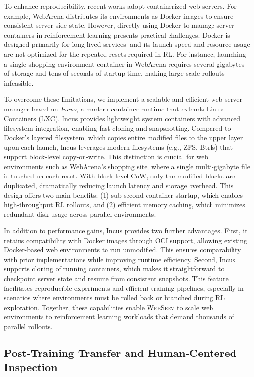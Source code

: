 \documentclass{article}
\DeclareRobustCommand{\projectname}{\textsc{WebServ}\xspace}
\begin{document}
To enhance reproducibility, recent works adopt containerized web servers. For example, WebArena distributes its environments as Docker images to ensure consistent server-side state. However, directly using Docker to manage server containers in reinforcement learning presents practical challenges. Docker is designed primarily for long-lived services, and its launch speed and resource usage are not optimized for the repeated resets required in RL. For instance, launching a single shopping environment container in WebArena requires several gigabytes of storage and tens of seconds of startup time, making large-scale rollouts infeasible.

To overcome these limitations, we implement a scalable and efficient web server manager based on \emph{Incus}, a modern container runtime that extends Linux Containers (LXC). Incus provides lightweight system containers with advanced filesystem integration, enabling fast cloning and snapshotting. Compared to Docker's layered filesystem, which copies entire modified files to the upper layer upon each launch, Incus leverages modern filesystems (e.g., ZFS, Btrfs) that support block-level copy-on-write. This distinction is crucial for web environments such as WebArena's shopping site, where a single multi-gigabyte file is touched on each reset. With block-level CoW, only the modified blocks are duplicated, dramatically reducing launch latency and storage overhead. This design offers two main benefits: (1) sub-second container startup, which enables high-throughput RL rollouts, and (2) efficient memory caching, which minimizes redundant disk usage across parallel environments.

In addition to performance gains, Incus provides two further advantages. First, it retains compatibility with Docker images through OCI support, allowing existing Docker-based web environments to run unmodified. This ensures comparability with prior implementations while improving runtime efficiency. Second, Incus supports cloning of running containers, which makes it straightforward to checkpoint server state and resume from consistent snapshots. This feature facilitates reproducible experiments and efficient training pipelines, especially in scenarios where environments must be rolled back or branched during RL exploration. Together, these capabilities enable \projectname to scale web environments to reinforcement learning workloads that demand thousands of parallel  rollouts.


\subsection{Post-Training Transfer and Human-Centered Inspection}
\end{document}
